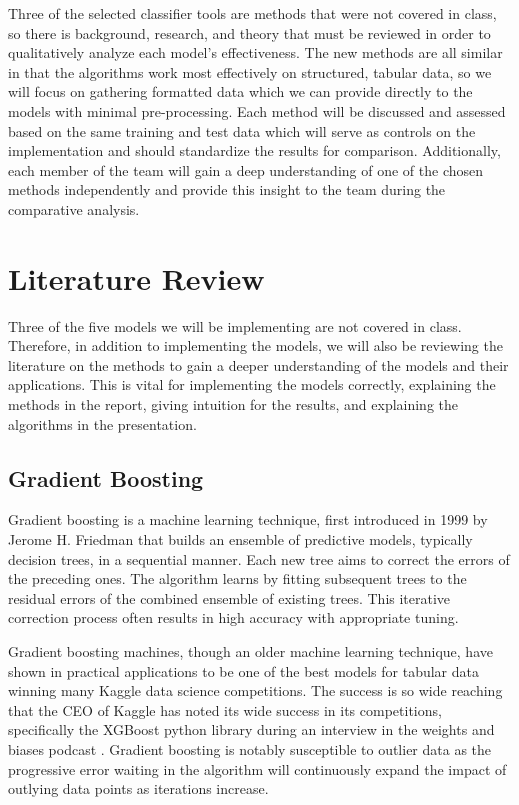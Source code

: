 \documentclass[10pt,twocolumn,letterpaper]{article}
\begin{document}
Three of the selected classifier tools are methods that were not covered in class, so there is background, research, and theory that must be reviewed in order to qualitatively analyze each model’s effectiveness.
The new methods are all similar in that the algorithms work most effectively on structured, tabular data, so we will focus on gathering formatted data which we can provide directly to the models with minimal pre-processing.
Each method will be discussed and assessed based on the same training and test data which will serve as controls on the implementation and should standardize the results for comparison.
Additionally, each member of the team will gain a deep understanding of one of the chosen methods independently and provide this insight to the team during the comparative analysis.


\section{Literature Review}
\label{sec:related}

Three of the five models we will be implementing are not covered in class.
Therefore, in addition to implementing the models, we will also be reviewing the literature on the methods to gain a deeper understanding of the models and their applications.
This is vital for implementing the models correctly, explaining the methods in the report, giving intuition for the results, and explaining the algorithms in the presentation.

\subsection{Gradient Boosting}

Gradient boosting is a machine learning technique, first introduced in 1999 by Jerome H. Friedman \cite{gradientboosting} that builds an ensemble of predictive models, typically decision trees, in a sequential manner.
Each new tree aims to correct the errors of the preceding ones.
The algorithm learns by fitting subsequent trees to the residual errors of the combined ensemble of existing trees.
This iterative correction process often results in high accuracy with appropriate tuning.

Gradient boosting machines, though an older machine learning technique, have shown in practical applications to be one of the best models for tabular data winning many Kaggle data science competitions.
The success is so wide reaching that the CEO of Kaggle has noted its wide success in its competitions, specifically the XGBoost \cite{xgboost} python library during an interview in the weights and biases podcast \cite{kaggle}.
Gradient boosting is notably susceptible to outlier data as the progressive error waiting in the algorithm will continuously expand the impact of outlying data points as iterations increase.
\end{document}
